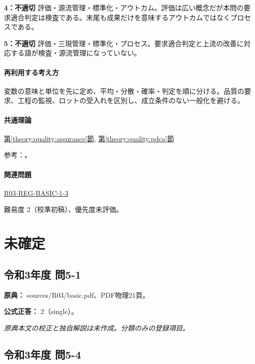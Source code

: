 \noindent\textbf{4：不適切} 評価・源流管理・標準化・アウトカム。評価は広い概念だが本問の要求適合判定は検査である。末尾も成果だけを意味するアウトカムではなくプロセスである。\par

\noindent\textbf{5：不適切} 評価・三現管理・標準化・プロセス。要求適合判定と上流の改善に対応する語が検査・源流管理になっていない。\par

\paragraph{再利用する考え方} 変数の意味と単位を先に定め、平均・分散・確率・判定を順に分ける。品質の要求、工程の監視、ロットの受入れを区別し、成立条件のない一般化を避ける。

\paragraph{共通理論} \hyperref[theory:quality:assurance]{第\ref*{theory:quality:assurance}節}, \hyperref[theory:quality:pdca]{第\ref*{theory:quality:pdca}節}

\par 参考：\cite{quality_process_jsqc,quality_iso_process}。

\paragraph{関連問題} \hyperref[q:r03-reg-basic-1-3]{R03-REG-BASIC-1-3}

\par 難易度 2（校準初稿）、優先度未評価。

\section{未確定}

\subsection{令和3年度 問5-1}
\label{q:r03-reg-basic-5-1}

\noindent\textbf{原典：} sources/R03/basic.pdf、PDF物理21頁。

\textbf{公式正答：} 2（single）。

\par\textit{原典本文の校正と独自解説は未作成。分類のみの登録項目。}

\subsection{令和3年度 問5-4}
\label{q:r03-reg-basic-5-4}

